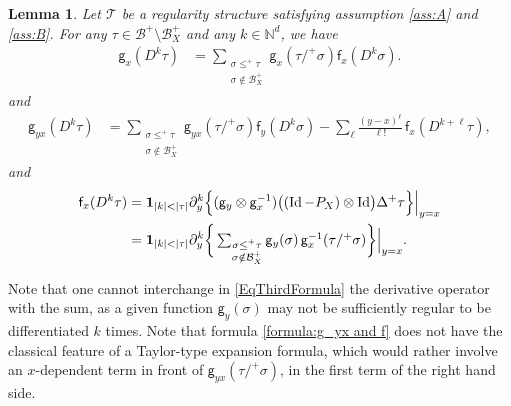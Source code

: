 \documentclass[JEP,XML,SOM,Unicode,published]{cedram}
\theoremstyle{plain}
\newtheorem{lem}[thm]{Lemma}
\theoremstyle{definition}
\DeclareMathOperator{\iden}{Id}
\newcommand{\sff}{\mathsf{f}}
\newcommand{\sfg}{\mathsf{g}}
\newcommand{\scrT}{\mathscr{T}}
\newcommand{\bbN}{\mathbb{N}}
\newcommand{\mcB}{\mathcal{B}}
\begin{document}
\begin{lem} \label{LemUsefulIdentities}
Let $\scrT$ be a regularity structure satisfying assumption \eqref{ass:A} and \eqref{ass:B}. For any $\tau\in\mcB^+\setminus\mcB_X^+$ and any $k\in\bbN^d$, we have
\begin{align} \label{formula:g_x and f_x}
\sfg_x(D^k\tau) &= \sum_{\substack{\sigma\leq^+\tau\\\sigma\notin\mcB_X^+}} \sfg_x(\tau/^+\sigma)\sff_x(D^k\sigma).
\end{align}
and
\begin{align} \label{formula:g_yx and f}
\sfg_{yx}(D^k\tau) &= \sum_{\substack{\sigma\leq^+\tau\\\sigma\notin\mcB_X^+}} \sfg_{yx}(\tau/^+\sigma)\sff_y(D^k\sigma) - \sum_{\ell}\frac{(y-x)^\ell}{\ell!}\,\sff_x(D^{k+\ell}\tau),
\end{align}
and
\begin{equation} \label{EqThirdFormula} \begin{split}
\sff_x(D^k\tau) &= {\bf1}_{|k|<|\tau|}\partial_y^k \Big\{({\sfg}_y\otimes\sfg_x^{-1}) \bigl((\iden -P_X)\otimes\iden \bigr) \Delta^+\tau\Big\}\Big|_{y=x} \\
 &= {\bf1}_{|k|<|\tau|}\partial_y^k \bigg\{
\textstyle\sum_{\substack{\sigma\leq^+\tau\\\sigma\notin\mcB_X^+}} \sfg_y(\sigma)\,\sfg_x^{-1}(\tau/^+\sigma)\bigg\}\Big|_{y=x}.
\end{split} \end{equation}
\end{lem}

Note that one cannot interchange in \eqref{EqThirdFormula} the derivative operator with the sum, as a given function ${\sfg}_y(\sigma)$ may not be sufficiently regular to be differentiated $k$ times. Note that formula \eqref{formula:g_yx and f} does not have the classical feature of a Taylor-type expansion formula, which would rather involve an $x$-dependent term in front of $\sfg_{yx}(\tau/^+\sigma)$, in the first term of the right hand side.
\end{document}
